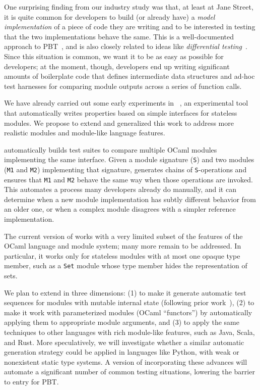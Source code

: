 %
One surprising finding from our industry study was that, at least at
Jane Street,
it is quite common for developers to build (or already have) a {\em
model implementation} of a piece of code they are writing and to be
interested in testing that the two
implementations behave the same.  This is a well-documented approach to
PBT~\cite{hughes_experiences_2016}, and is also closely related to ideas like
{\em differential testing}~\cite{mckeeman1998differential}.
%
Since this situation is common, we want it to be as easy as possible
for developers; at the moment, though, developers end up writing
significant amounts of boilerplate code that defines intermediate data
structures and ad-hoc test harnesses for comparing module outputs across a
series of function calls.

We have already carried out some early experiments in
{\Mica}~\cite{Ng2023MicaPoster}, an experimental tool that automatically
writes properties based on simple interfaces for stateless modules.
We propose to extend and generalized this work to address more
realistic modules and module-like language features.


{\Mica} automatically builds test suites to compare multiple OCaml
modules implementing the same interface. Given a module signature
(\lstinline{S}) and two modules
(\lstinline{M1} and \lstinline{M2}) implementing that signature, {\Mica}
generates chains of \lstinline{S}-operations and ensures that
\lstinline{M1} and \lstinline{M2} behave the same way when those operations are
invoked. This automates a process many developers already do manually,
and it can
determine when a new module implementation has subtly different
behavior from an older one, or when a
complex module disagrees with a simpler reference implementation.

The current version of {\Mica} works with a very limited subset of
the features of the OCaml language and
module system; many more remain to be addressed. In particular, it
works only for stateless modules with at most one opaque type
member, such as a {\tt Set} module whose type member hides the
representation of sets.

We plan to extend {\Mica} in three dimensions: (1) to make it generate automatic
test sequences for modules with mutable internal state (following prior work~\cite{midtgaard_2020,monolith}), (2) to
make it work with parameterized modules (OCaml ``functors'') by
automatically applying them to appropriate module arguments, and (3)
to apply the same techniques to other languages with rich module-like
features, such as Java, Scala, and Rust.  More speculatively, we will
investigate whether a similar automatic generation strategy could be
applied in languages like Python, with weak or nonexistent static type
systems.
%
A version of \Mica{} incorporating these advances will automate a
significant number of common testing situations, lowering the barrier
to entry for PBT.

